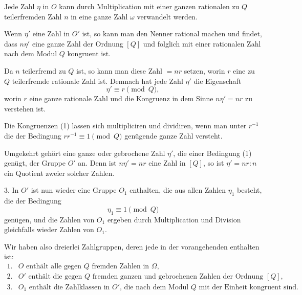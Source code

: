 \documentclass[11pt]{article}
\begin{document}
Jede Zahl $\eta$ in $O$ kann durch Multiplication mit einer ganzen rationalen zu $Q$ teilerfremden Zahl $n$ in eine ganze Zahl $\omega$ verwandelt werden.

Wenn $\eta'$ eine Zahl in $O'$ ist, so kann man den Nenner rational machen und findet, dass $n\eta'$ eine ganze Zahl der Ordnung $[Q]$ und folglich mit einer rationalen Zahl nach dem Modul $Q$ kongruent ist.

Da $n$ teilerfremd zu $Q$ ist, so kann man diese Zahl $=nr$ setzen, worin $r$ eine zu $Q$ teilerfremde rationale Zahl ist. Demnach hat jede Zahl $\eta'$ die Eigenschaft
\begin{equation}
 \eta'\equiv r\pmod Q,
\tag{1}
\end{equation}
worin $r$ eine ganze rationale Zahl und die Kongruenz in dem Sinne $n\eta'=nr$ zu verstehen ist.

Die Kongruenzen (1) lassen sich multipliciren und dividiren, wenn man unter $r^{-1}$ die der Bedingung $rr^{-1}\equiv1\pmod Q$ genügende ganze Zahl versteht.

Umgekehrt gehört eine ganze oder gebrochene Zahl $\eta'$, die einer Bedingung (1) genügt, der Gruppe $O'$ an. Denn ist $n\eta'=nr$ eine Zahl in $[Q]$, so ist $\eta'=nr:n$ ein Quotient zweier solcher Zahlen.

3. In $O'$ ist nun wieder eine Gruppe $O_1$ enthalten, die aus allen Zahlen $\eta_1$ besteht, die der Bedingung
\begin{equation}
 \eta_1\equiv1\pmod Q
\tag{2}
\end{equation}
genügen, und die Zahlen von $O_1$ ergeben durch Multiplication und Division gleichfalls wieder Zahlen von $O_1$.

Wir haben also dreierlei Zahlgruppen, deren jede in der vorangehenden enthalten ist:
\[
\begin{array}{ll}
1.& O \text{ enthält alle gegen }Q\text{ fremden Zahlen in }\Omega,\\
2.& O' \text{ enthält die gegen }Q\text{ fremden ganzen und gebrochenen Zahlen der Ordnung }[Q],\\
3.& O_1 \text{ enthält die Zahlklassen in }O'\text{, die nach dem Modul }Q\text{ mit der Einheit kongruent sind.}
\end{array}
\]
\end{document}
